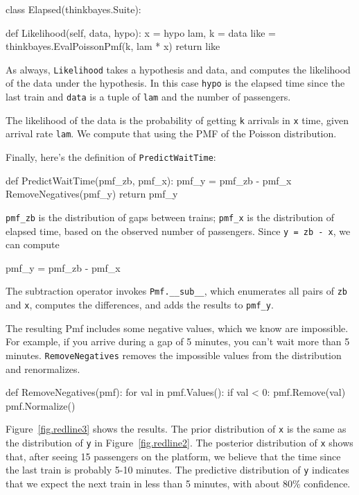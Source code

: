 \documentclass[12pt]{book}
\theoremstyle{exercise}
\begin{document}
\begin{code}
class Elapsed(thinkbayes.Suite):

    def Likelihood(self, data, hypo):
        x = hypo
        lam, k = data
        like = thinkbayes.EvalPoissonPmf(k, lam * x)
        return like
\end{code}

As always, {\tt Likelihood} takes a hypothesis and data, and
computes the likelihood of the data under the hypothesis.
In this case {\tt hypo} is the elapsed time since the last train
and {\tt data} is a tuple of {\tt lam} and the number of
passengers.

The likelihood of the data is the probability of getting
{\tt k} arrivals in {\tt x} time, given arrival rate
{\tt lam}.  We compute that using the PMF of the Poisson
distribution.

Finally, here's the definition of {\tt PredictWaitTime}:

\begin{code}
def PredictWaitTime(pmf_zb, pmf_x):
    pmf_y = pmf_zb - pmf_x
    RemoveNegatives(pmf_y)
    return pmf_y
\end{code}

\verb"pmf_zb" is the distribution of gaps between trains;
\verb"pmf_x" is the distribution of elapsed time, based on
the observed number of passengers.  Since {\tt y = zb - x},
we can compute

\begin{code}
    pmf_y = pmf_zb - pmf_x
\end{code}

The subtraction operator invokes \verb"Pmf.__sub__", which enumerates
all pairs of {\tt zb} and {\tt x}, computes the differences, and adds
the results to \verb"pmf_y".

The resulting Pmf includes some negative values, which we know are
impossible.  For example, if you arrive during a gap of 5 minutes, you
can't wait more than 5 minutes.  {\tt RemoveNegatives} removes the
impossible values from the distribution and renormalizes.

\begin{code}
def RemoveNegatives(pmf):
    for val in pmf.Values():
        if val < 0:
            pmf.Remove(val)
    pmf.Normalize()
\end{code}

Figure~\ref{fig.redline3} shows the results.  The prior distribution
of {\tt x} is the same as the distribution of {\tt y} in
Figure~\ref{fig.redline2}.  The posterior distribution of {\tt x}
shows that, after seeing 15 passengers on the platform, we believe
that the time since the last train is probably 5-10 minutes.  The
predictive distribution of {\tt y} indicates that we expect the next
train in less than 5 minutes, with about 80\% confidence.
\end{document}
